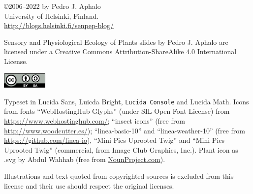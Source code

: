   \begin{frame}[c]
    \begin{center}
      \begin{small}
        \copyright 2006--2022 by Pedro J. Aphalo\\
        University of Helsinki, Finland.\\
        \textcolor{blue}{\url{http://blogs.helsinki.fi/senpep-blog/}}\\[2ex]
      \end{small}

      \begin{footnotesize}
        Sensory and Physiological Ecology of Plants slides by Pedro J. Aphalo are licensed under a Creative Commons Attribution-ShareAlike 4.0 International License.

      \includegraphics[width=6em]{../figures/copyright/by-sa}\\[2ex]
      \end{footnotesize}
        
        \begin{scriptsize}
        Typeset in Lucida Sans, \textrm{Luicda Bright}, \texttt{Lucida Console} and Lucida Math. Icons from fonts ``WebHostingHub Glyphs'' (under SIL-Open Font License) from \url{https://www.webhostinghub.com/}; ``insect icons'' (free from \url{http://www.woodcutter.es/}); ``linea-basic-10'' and ``linea-weather-10'' (free from \url{https://github.com/linea-io}), ``Mini Pics Uprooted Twig'' and ``Mini Pics Uprooted Twig'' (commercial, from Image Club Graphics, Inc.). Plant icon as .svg by Abdul Wahhab (free from \url{NounProject.com}).

        Illustrations and text quoted from copyrighted sources is excluded from this license and their use should respect the original licenses.
        \end{scriptsize}
    \end{center}
  \end{frame}
